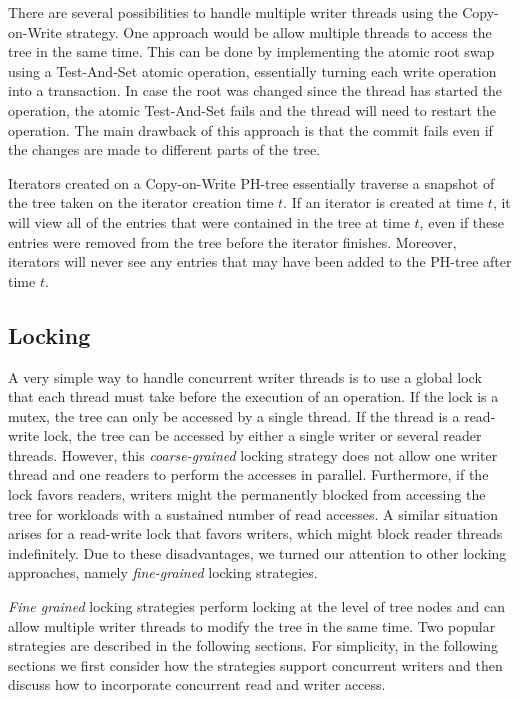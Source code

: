 \documentclass[11pt,a4paper]{globis-book}
\begin{document}
There are several possibilities to handle multiple writer threads using the Copy-on-Write strategy. One approach would be allow multiple threads to access the tree in the same time. This can be done by implementing the atomic root swap using a Test-And-Set atomic operation, essentially turning each write operation into a transaction. In case the root was changed since the thread has started the operation, the atomic Test-And-Set fails and the thread will need to restart the operation. The main drawback of this approach is that the commit fails even if the changes are made to different parts of the tree.

Iterators created on a Copy-on-Write PH-tree essentially traverse a snapshot of the tree taken on the iterator creation time $t$. If an iterator is created at time $t$, it will view all of the entries that were contained in the tree at time $t$, even if these entries were removed from the tree before the iterator finishes. Moreover, iterators will never see any entries that may have been added to the PH-tree after time $t$.

\subsection{Locking}

A very simple way to handle concurrent writer threads is to use a global lock that each thread must take before the execution of an operation. If the lock is a mutex, the tree can only be accessed by a single thread. If the thread is a read-write lock, the tree can be accessed by either a single writer or several reader threads. However, this \textit{coarse-grained} locking strategy does not allow one writer thread and one readers to perform the accesses in parallel. Furthermore, if the lock favors readers, writers might the permanently blocked from accessing the tree for workloads with a sustained number of read accesses. A similar situation arises for a read-write lock that favors writers, which might block reader threads indefinitely. Due to these disadvantages, we turned our attention to other locking approaches, namely \textit{fine-grained} locking strategies.  

\textit{Fine grained} locking strategies perform locking at the level of tree nodes and can allow multiple writer threads to modify the tree in the same time. Two popular strategies are described in the following sections. For simplicity, in the following sections we first consider how the strategies support concurrent writers and then discuss how to incorporate concurrent read and writer access.  
\end{document}
